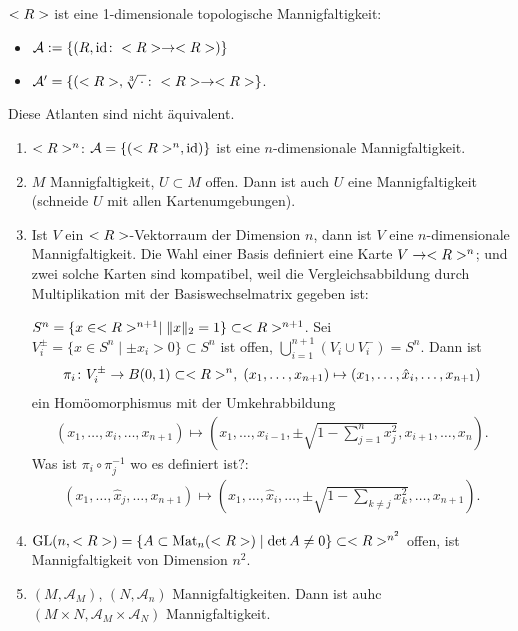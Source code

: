 \begin{example}
	$<R>$ ist eine 1-dimensionale topologische Mannigfaltigkeit: \begin{itemize}
		\item $\mathcal A := \{ (R,\operatorname{id}\colon <R>\to <R>) \}$
		\item $\mathcal A' = \{ (<R>,\sqrt[3]{\,\cdot\,}\colon<R>\to<R> \}$.
	\end{itemize}
	Diese Atlanten sind nicht äquivalent.
\end{example}

\begin{example}
	\begin{enumerate}[label={(\arabic*)}]
		\item $<R>^n$: $\mathcal A = \{ (<R>^n,\operatorname{id}) \}$ ist eine $n$-dimensionale Mannigfaltigkeit.
		\item $M$ Mannigfaltigkeit, $U\subset M$ offen. Dann ist auch $U$ eine Mannigfaltigkeit (schneide $U$ mit allen Kartenumgebungen).
		\item Ist $V$ ein $<R>$-Vektorraum der Dimension $n$, dann ist $V$ eine $n$-dimensionale Mannigfaltigkeit. Die Wahl einer Basis definiert eine Karte $V\to<R>^n$; und zwei solche Karten sind kompatibel, weil die Vergleichsabbildung durch Multiplikation mit der Basiswechselmatrix gegeben ist:
		
		$S^n = \{x\in<R>^{n+1}\mid \Vert x\Vert_2 = 1\}\subset<R>^{n+1}$. Sei $V_i^{\pm} = \{x\in S^n\mid \pm x_i > 0\}\subset S^n$ ist offen, $\bigcup_{i=1}^{n+1} (V_i\cup V_i^-) = S^n$. Dann ist \begin{align*}
			\pi_i\colon V_i^{\pm}\to B(0,1)\subset <R>^n,\;(x_1,\dots,x_{n+1})\mapsto (x_1,\dots,\hat x_i,\dots,x_{n+1})
		\end{align*}
		ein Homöomorphismus mit der Umkehrabbildung \begin{align*}
			(x_1,\dots, x_i,\dots,x_{n+1})\mapsto (x_1,\dots,x_{i-1},\pm\sqrt{1-\sum_{j=1}^n x_j^2},x_{i+1},\dots,x_n).
		\end{align*}
		Was ist $\pi_i\circ \pi_j^{-1}$ wo es definiert ist?: \begin{align*}
			(x_1,\dots,\hat x_j,\dots,x_{n+1})\mapsto (x_1,\dots,\hat x_i,\dots,\pm\sqrt{1-\sum_{k\neq j} x_k^2},\dots,x_{n+1}).
		\end{align*}
		\item $\operatorname{GL}(n,<R>) = \{ A\subset \operatorname{Mat}_n(<R>)\mid \det A\neq 0\}\subset <R>^{n^2}$ offen, ist Mannigfaltigkeit von Dimension $n^2$.
		\item $(M,\mathcal A_M)$, $(N,\mathcal A_n)$ Mannigfaltigkeiten. Dann ist auhc $(M\times N, \mathcal A_M\times \mathcal A_N)$ Mannigfaltigkeit.
	\end{enumerate}
\end{example}
